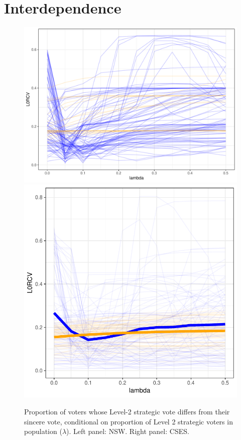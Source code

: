\documentclass[11pt, letter, margin = 2 in]{article}
\begin{document}
\section{Interdependence}

\begin{figure}[!h]
	\centering
	\includegraphics[width = .45 \textwidth]{"../output/figures/level0_diff"}
	\includegraphics[width = .45 \textwidth]{"../output/figures/cses_l0"}
	\caption{Proportion of voters whose Level-2 strategic vote differs from their sincere vote, conditional on proportion of Level 2 strategic voters in population ($\lambda$). Left panel: NSW. Right panel: CSES.}
	\label{fig:figure1}
\end{figure}
\end{document}
